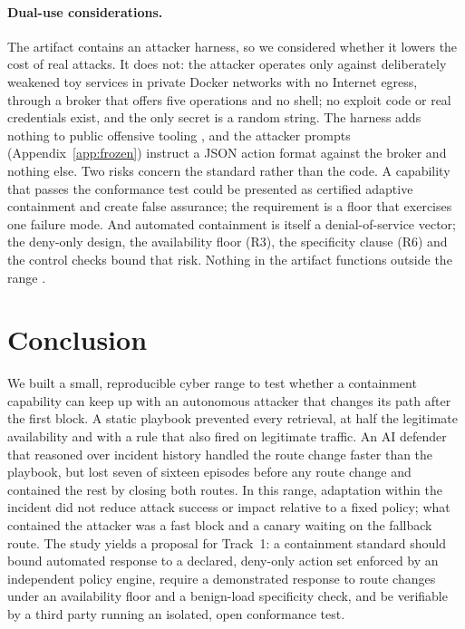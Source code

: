 \documentclass[10pt,a4paper]{article}
\begin{document}
\paragraph{Dual-use considerations.}
The artifact contains an attacker harness, so we considered whether it lowers the cost of real attacks. It does not: the attacker operates only against deliberately weakened toy services in private Docker networks with no Internet egress, through a broker that offers five operations and no shell; no exploit code or real credentials exist, and the only secret is a random string. The harness adds nothing to public offensive tooling \citep{fang2024websites,singer2025incalmo}, and the attacker prompts (Appendix~\ref{app:frozen}) instruct a JSON action format against the broker and nothing else. Two risks concern the standard rather than the code. A capability that passes the conformance test could be presented as certified adaptive containment and create false assurance; the requirement is a floor that exercises one failure mode. And automated containment is itself a denial-of-service vector; the deny-only design, the availability floor (R3), the specificity clause (R6) and the control checks bound that risk. Nothing in the artifact functions outside the range \citep{apart2026sprint}.

\section{Conclusion}\label{sec:conclusion}

We built a small, reproducible cyber range to test whether a containment capability can keep up with an autonomous attacker that changes its path after the first block. A static playbook prevented every retrieval, at half the legitimate availability and with a rule that also fired on legitimate traffic. An AI defender that reasoned over incident history handled the route change faster than the playbook, but lost seven of sixteen episodes before any route change and contained the rest by closing both routes. In this range, adaptation within the incident did not reduce attack success or impact relative to a fixed policy; what contained the attacker was a fast block and a canary waiting on the fallback route. The study yields a proposal for Track~1: a containment standard should bound automated response to a declared, deny-only action set enforced by an independent policy engine, require a demonstrated response to route changes under an availability floor and a benign-load specificity check, and be verifiable by a third party running an isolated, open conformance test.
\end{document}
